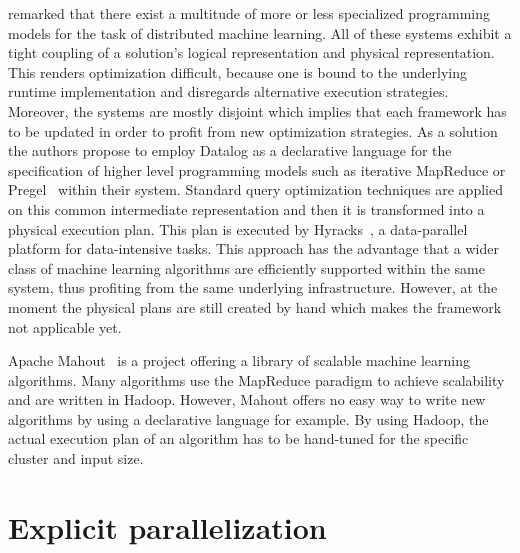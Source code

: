 \Textcite{bu:apa2012a} remarked that there exist a multitude of more or less specialized programming models for the task of distributed machine learning.
All of these systems exhibit a tight coupling of a solution's logical representation and physical representation.
This renders optimization difficult, because one is bound to the underlying runtime implementation and disregards alternative execution strategies.
Moreover, the systems are mostly disjoint which implies that each framework has to be updated in order to profit from new optimization strategies.
As a solution the authors propose to employ Datalog as a declarative language for the specification of higher level programming models such as iterative MapReduce or Pregel~\cite{malewicz:2010a} within their system.
Standard query optimization techniques are applied on this common intermediate representation and then it is transformed into a physical execution plan.
This plan is executed by Hyracks~\cite{borkar:2011a}, a data-parallel platform for data-intensive tasks.
This approach has the advantage that a wider class of machine learning algorithms are efficiently supported within the same system, thus profiting from the same underlying infrastructure.
However, at the moment the physical plans are still created by hand which makes the framework not applicable yet.

Apache Mahout~\cite{mahout:2011a} is a project offering a library of scalable machine learning algorithms.
Many algorithms use the MapReduce paradigm to achieve scalability and are written in Hadoop.
However, Mahout offers no easy way to write new algorithms by using a declarative language for example.
By using Hadoop, the actual execution plan of an algorithm has to be hand-tuned for the specific cluster and input size.

\section{Explicit parallelization}
